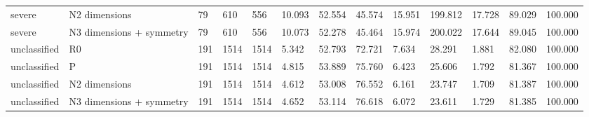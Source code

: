 \begin{table}[t]
{\begin{tabular}{lllllllllllll}
severe & N2 dimensions & 79 & 610 & 556 & 10.093 & 52.554 & 45.574 & 15.951 & 199.812 & 17.728 & 89.029 & 100.000 \\
severe & N3 dimensions + symmetry & 79 & 610 & 556 & 10.073 & 52.278 & 45.464 & 15.974 & 200.022 & 17.644 & 89.045 & 100.000 \\
unclassified & R0 & 191 & 1514 & 1514 & 5.342 & 52.793 & 72.721 & 7.634 & 28.291 & 1.881 & 82.080 & 100.000 \\
unclassified & P & 191 & 1514 & 1514 & 4.815 & 53.889 & 75.760 & 6.423 & 25.606 & 1.792 & 81.367 & 100.000 \\
unclassified & N2 dimensions & 191 & 1514 & 1514 & 4.612 & 53.008 & 76.552 & 6.161 & 23.747 & 1.709 & 81.387 & 100.000 \\
unclassified & N3 dimensions + symmetry & 191 & 1514 & 1514 & 4.652 & 53.114 & 76.618 & 6.072 & 23.611 & 1.729 & 81.385 & 100.000 \\
\hline
\end{tabular}}
\end{table}
